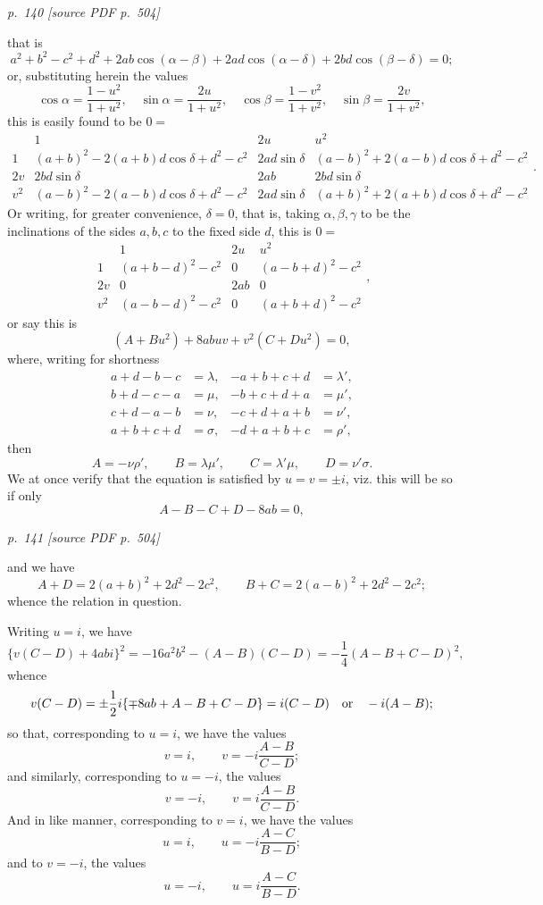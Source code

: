 \documentclass[11pt,a4paper]{article}
\newcommand{\sourcepage}[2]{%
  \bigskip
  \noindent\textit{p.~#1 [source PDF p.~#2]}%
  \par\smallskip
}
\begin{document}
\sourcepage{140}{504}
that is
\[
a^2+b^2-c^2+d^2+2ab\cos(\alpha-\beta)
+2ad\cos(\alpha-\delta)+2bd\cos(\beta-\delta)=0;
\]
or, substituting herein the values
\[
\cos\alpha=\frac{1-u^2}{1+u^2},\quad
\sin\alpha=\frac{2u}{1+u^2},\quad
\cos\beta=\frac{1-v^2}{1+v^2},\quad
\sin\beta=\frac{2v}{1+v^2},
\]
this is easily found to be $0=$
\[
\renewcommand{\arraystretch}{1.6}
\begin{array}{c|ccc}
&1&2u&u^2\\ \hline
1&(a+b)^2-2(a+b)d\cos\delta+d^2-c^2&2ad\sin\delta&
(a-b)^2+2(a-b)d\cos\delta+d^2-c^2\\
2v&2bd\sin\delta&2ab&2bd\sin\delta\\
v^2&(a-b)^2-2(a-b)d\cos\delta+d^2-c^2&2ad\sin\delta&
(a+b)^2+2(a+b)d\cos\delta+d^2-c^2
\end{array}.
\]
Or writing, for greater convenience, $\delta=0$, that is, taking
$\alpha,\beta,\gamma$ to be the inclinations of the sides $a,b,c$ to the fixed side
$d$, this is $0=$
\[
\renewcommand{\arraystretch}{1.6}
\begin{array}{c|ccc}
&1&2u&u^2\\ \hline
1&(a+b-d)^2-c^2&0&(a-b+d)^2-c^2\\
2v&0&2ab&0\\
v^2&(a-b-d)^2-c^2&0&(a+b+d)^2-c^2
\end{array},
\]
or say this is
\[
(A+Bu^2)+8abuv+v^2(C+Du^2)=0,
\]
where, writing for shortness
\[
\begin{array}{rlrl}
a+d-b-c&=\lambda,& -a+b+c+d&=\lambda',\\
b+d-c-a&=\mu,& -b+c+d+a&=\mu',\\
c+d-a-b&=\nu,& -c+d+a+b&=\nu',\\
a+b+c+d&=\sigma,& -d+a+b+c&=\rho',
\end{array}
\]
then
\[
A=-\nu\rho',\qquad B=\lambda\mu',\qquad
C=\lambda'\mu,\qquad D=\nu'\sigma.
\]
We at once verify that the equation is satisfied by $u=v=\pm i$, viz. this will be
so if only
\[
A-B-C+D-8ab=0,
\]

\sourcepage{141}{504}
and we have
\[
A+D=2(a+b)^2+2d^2-2c^2,
\qquad
B+C=2(a-b)^2+2d^2-2c^2;
\]
whence the relation in question.

Writing $u=i$, we have
\[
\{v(C-D)+4abi\}^2
=-16a^2b^2-(A-B)(C-D)
=-\frac14(A-B+C-D)^2,
\]
whence
\[
v(C-D)=\pm\frac12 i\{\mp 8ab+A-B+C-D\}
=i(C-D)\quad\hbox{or}\quad -i(A-B);
\]
so that, corresponding to $u=i$, we have the values
\[
v=i,\qquad v=-i\frac{A-B}{C-D};
\]
and similarly, corresponding to $u=-i$, the values
\[
v=-i,\qquad v=i\frac{A-B}{C-D}.
\]
And in like manner, corresponding to $v=i$, we have the values
\[
u=i,\qquad u=-i\frac{A-C}{B-D};
\]
and to $v=-i$, the values
\[
u=-i,\qquad u=i\frac{A-C}{B-D}.
\]
\end{document}
